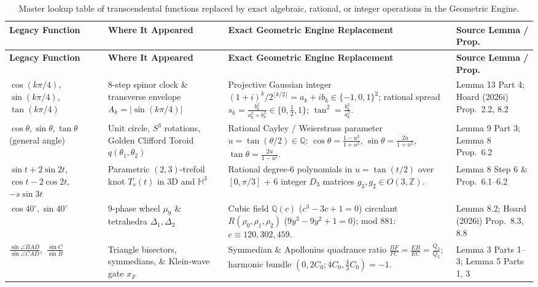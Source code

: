 \documentclass[11pt, a4paper]{article}
\begin{document}
\begin{longtable}{@{}p{3.2cm}p{3.8cm}p{4.8cm}p{2.8cm}@{}}
\caption{Master lookup table of transcendental functions replaced by exact algebraic, rational, or integer operations in the Geometric Engine.} \label{tab:trig-replacements} \\
\toprule
\textbf{Legacy Function} & \textbf{Where It Appeared} & \textbf{Exact Geometric Engine Replacement} & \textbf{Source Lemma / Prop.} \\
\midrule
\endfirsthead
\toprule
\textbf{Legacy Function} & \textbf{Where It Appeared} & \textbf{Exact Geometric Engine Replacement} & \textbf{Source Lemma / Prop.} \\
\midrule
\endhead
\bottomrule
\endfoot
$\cos(k\pi/4),$ \newline $\sin(k\pi/4),$ \newline $\tan(k\pi/4)$ & 8-step spinor clock \& transverse envelope $A_k = |\sin(k\pi/4)|$ & Projective Gaussian integer $(1+i)^k / 2^{\lfloor k/2\rfloor} = a_k + i b_k \in \{-1,0,1\}^2$; rational spread $s_k = \frac{b_k^2}{a_k^2+b_k^2} \in \{0, \frac{1}{2}, 1\}$; $\tan^2 = \frac{b_k^2}{a_k^2}$. & Lemma 13 Part 4; Hoard (2026i) Prop.~2.2, 8.2 \\
\addlinespace
$\cos\theta, \sin\theta, \tan\theta$ \newline (general angle) & Unit circle, $S^3$ rotations, Golden Clifford Toroid $q(\theta_1,\theta_2)$ & Rational Cayley / Weierstrass parameter $u = \tan(\theta/2) \in \mathbb{Q}$: $\cos\theta = \frac{1-u^2}{1+u^2}$, $\sin\theta = \frac{2u}{1+u^2}$, $\tan\theta = \frac{2u}{1-u^2}$. & Lemma 9 Part 3; Lemma 8 Prop.~6.2 \\
\addlinespace
$\sin t + 2\sin 2t,$ \newline $\cos t - 2\cos 2t,$ \newline $-s\sin 3t$ & Parametric $(2,3)$-trefoil knot $T_s(t)$ in 3D and $\mathbb{H}^3$ & Rational degree-6 polynomials in $u = \tan(t/2)$ over $[0, \pi/3]$ + 6 integer $D_3$ matrices $g_3, g_2 \in O(3,\mathbb{Z})$. & Lemma 8 Step 6 \& Prop.~6.1--6.2 \\
\addlinespace
$\cos 40^\circ, \sin 40^\circ$ & 9-phase wheel $\mu_9$ \& tetrahedra $\Delta_1, \Delta_2$ & Cubic field $\mathbb{Q}(c)$ ($c^3 - 3c + 1 = 0$) circulant $R(\rho_0, \rho_1, \rho_2)$ ($9y^3 - 9y^2 + 1 = 0$); mod $881$: $c \equiv 120, 302, 459$. & Lemma 8.2; Hoard (2026i) Prop.~8.3, 8.8 \\
\addlinespace
$\frac{\sin\angle BAD}{\sin\angle CAD},$ \newline $\frac{\sin C}{\sin B}$ & Triangle bisectors, symmedians, \& Klein-wave gate $x_F$ & Symmedian \& Apollonius quadrance ratio $\frac{BF}{FC} = \frac{EB}{EC} = \frac{Q_3}{Q_2}$; harmonic bundle $(0,2C_0; 4C_0, \frac{4}{3}C_0) = -1$. & Lemma 3 Parts 1--3; Lemma 5 Parts 1, 3 \\

\end{longtable}
\end{document}
